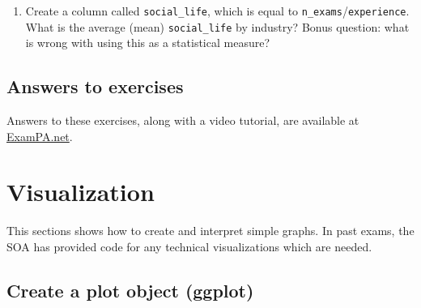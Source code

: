 \documentclass[openany]{book}
\newenvironment{Shaded}{\begin{snugshade}}{\end{snugshade}}
\newcommand{\DataTypeTok}[1]{\textcolor[rgb]{0.13,0.29,0.53}{#1}}
\newcommand{\KeywordTok}[1]{\textcolor[rgb]{0.13,0.29,0.53}{\textbf{#1}}}
\newcommand{\NormalTok}[1]{#1}
\newcommand{\OperatorTok}[1]{\textcolor[rgb]{0.81,0.36,0.00}{\textbf{#1}}}
\newcommand{\OtherTok}[1]{\textcolor[rgb]{0.56,0.35,0.01}{#1}}
\newcommand{\StringTok}[1]{\textcolor[rgb]{0.31,0.60,0.02}{#1}}
\providecommand{\tightlist}{%
  \setlength{\itemsep}{0pt}\setlength{\parskip}{0pt}}
\begin{document}
\begin{Shaded}
\end{Shaded}

\begin{enumerate}
\def\labelenumi{\arabic{enumi}.}
\setcounter{enumi}{7}
\tightlist
\item
  Create a column called \texttt{social\_life}, which is equal to \texttt{n\_exams}/\texttt{experience}. What is the average (mean) \texttt{social\_life} by industry? Bonus question: what is wrong with using this as a statistical measure?
\end{enumerate}

\hypertarget{answers-to-exercises}{%
\section{Answers to exercises}\label{answers-to-exercises}}

Answers to these exercises, along with a video tutorial, are available at \href{https://www.exampa.net/pricing}{ExamPA.net}.

\hypertarget{visualization}{%
\chapter{Visualization}\label{visualization}}

This sections shows how to create and interpret simple graphs. In past exams, the SOA has provided code for any technical visualizations which are needed.

\hypertarget{create-a-plot-object-ggplot}{%
\section{Create a plot object (ggplot)}\label{create-a-plot-object-ggplot}}
\end{document}
